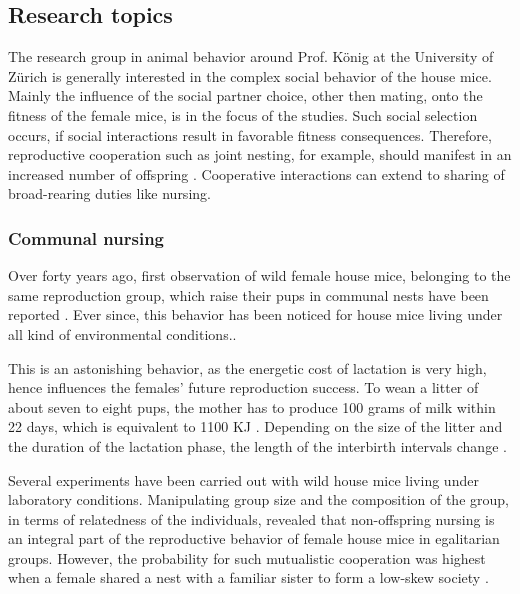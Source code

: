 \subsection{Research topics}
\label{subsec:researchtopics}

The research group in animal behavior around Prof. K\"onig at the University of Z\"urich is generally interested in the complex social behavior of the house mice. Mainly the influence of the social partner choice, other then mating, onto the fitness of the female mice, is in the focus of the studies. Such social selection occurs, if social interactions result in favorable fitness consequences. Therefore, reproductive cooperation such as joint nesting, for example, should manifest in an increased number of offspring \cite{weidt:07}. Cooperative interactions can extend to sharing of broad-rearing duties like nursing.

\subsubsection{Communal nursing}
\label{subsubsec:comnurs}

Over forty years ago, first observation of wild female house mice, belonging to the same reproduction group, which raise their pups in communal nests have been reported \cite{southwick:55}. Ever since, this behavior has been noticed for house mice living under all kind of environmental conditions.\cite{crowcroft:63, sayler:69, gandelman:70, werboff:70, baker:81}.

This is an astonishing behavior, as the energetic cost of lactation is very high, hence influences the females' future reproduction success. To wean a litter of about seven to eight pups, the mother has to produce 100 grams of milk within 22 days, which is equivalent to 1100 \acf{KJ} \cite{koenig:88}. Depending on the size of the litter and the duration of the lactation phase, the length of the interbirth intervals change \cite{fuchs:81, fuchs:82, koenig:87a, koenig:87b}.

Several experiments have been carried out with wild house mice living under laboratory conditions. Manipulating group size and the composition of the group, in terms of relatedness of the individuals, revealed that non-offspring nursing is an integral part of the reproductive behavior of female house mice in egalitarian groups. However, the probability for such mutualistic cooperation was highest when a female shared a nest with a familiar sister to form a low-skew society \cite{koenig:06}.

